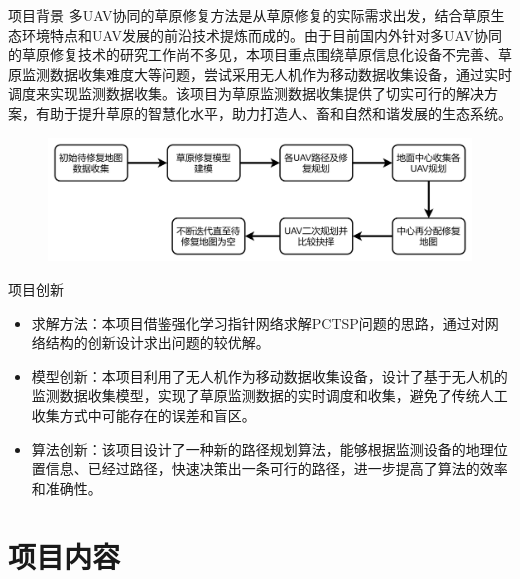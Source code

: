 \documentclass{beamer}
\begin{document}
\begin{frame}{项目背景}
    \quad \quad 多UAV协同的草原修复方法是从草原修复的实际需求出发，结合草原生态环境特点和UAV发展的前沿技术提炼而成的。由于目前国内外针对多UAV协同的草原修复技术的研究工作尚不多见，本项目重点围绕草原信息化设备不完善、草原监测数据收集难度大等问题，尝试采用无人机作为移动数据收集设备，通过实时调度来实现监测数据收集。该项目为草原监测数据收集提供了切实可行的解决方案，有助于提升草原的智慧化水平，助力打造人、畜和自然和谐发展的生态系统。\cite{8470897}\cite{9018112}

    \begin{figure}[htbp]
        \centering
        \includegraphics[scale=0.1]{pic/0.png}
    \end{figure}
\end{frame}

\begin{frame}{项目创新}
    \begin{itemize}
        \item 求解方法：本项目借鉴强化学习指针网络求解PCTSP问题的思路，通过对网络结构的创新设计求出问题的较优解。
        \item 模型创新：本项目利用了无人机作为移动数据收集设备，设计了基于无人机的监测数据收集模型，实现了草原监测数据的实时调度和收集，避免了传统人工收集方式中可能存在的误差和盲区。
        \item 算法创新：该项目设计了一种新的路径规划算法，能够根据监测设备的地理位置信息、已经过路径，快速决策出一条可行的路径，进一步提高了算法的效率和准确性。
    \end{itemize}
\end{frame}

\section{项目内容}
\end{document}
